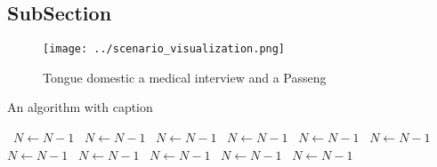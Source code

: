 \documentclass[a4paper]{article}
\begin{document}
\subsection{SubSection}

\begin{figure}
\centering
\texttt{[image: ../scenario\_visualization.png]}
\caption{Tongue domestic a medical interview and a Passeng
}
\end{figure}
 
\begin{algorithm}
\caption{An algorithm with caption}
\begin{algorithmic}
\    \State $N \gets N - 1$
\    \State $N \gets N - 1$
\    \State $N \gets N - 1$
\    \State $N \gets N - 1$
\    \State $N \gets N - 1$
\    \State $N \gets N - 1$
\    \State $N \gets N - 1$
\    \State $N \gets N - 1$
\    \State $N \gets N - 1$
\    \State $N \gets N - 1$
\    \State $N \gets N - 1$
\EndWhile
\end{algorithmic}
\end{algorithm}
\end{document}
